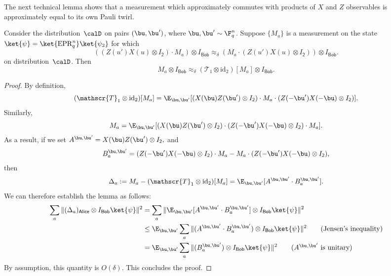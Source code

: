 \documentclass[11pt]{article}
\newcommand{\twirl}{\mathscr{T}}
\newcommand{\reg}[1]{{\mathsf{#1}}}
\begin{document}
The next technical lemma shows that a measurement which approximately commutes with products of $X$ and $Z$ observables
is approximately equal to its own Pauli twirl.

\begin{lemma}\label{lem:commute-to-twirl}
Consider the distribution~$\calD$ on pairs $(\bu, \bu')$, where $\bu, \bu' \sim \F_q^n$.
Suppose $\{M_{a}\}$ is a measurement on the state $\ket{\psi} = \ket{\mathrm{EPR}_q^n} \ket{\psi_2}$ for which
\begin{equation*}
((Z(u') X(u)\otimes I_{\reg{2}}) \cdot M_{a}) \otimes I_{\reg{Bob}}
\approx_{\delta} (M_{a} \cdot (Z(u') X(u)\otimes I_{\reg{2}})) \otimes I_{\reg{Bob}}.
\end{equation*}
on distribution~$\calD$. Then
\begin{equation*}
M_{a} \otimes I_{\reg{Bob}} \approx_{\delta} (\twirl_1 \otimes \mathrm{id}_{\mathrm{2}})[M_{a}] \otimes I_{\reg{Bob}}.
\end{equation*}
\end{lemma}
\begin{proof}
By definition,
\begin{equation*}
(\twirl_1 \otimes \mathrm{id}_{\mathrm{2}})[M_{a}]
= \E_{\bu, \bu'} [(X(\bu) Z(\bu') \otimes I_{\reg{2}}) \cdot M_a \cdot (Z(-\bu') X(-\bu) \otimes I_{\reg{2}})].
\end{equation*}
Similarly,
\begin{equation*}
M_{a}
= \E_{\bu, \bu'} [(X(\bu) Z(\bu') \otimes I_{\reg{2}}) \cdot (Z(-\bu') X(-\bu) \otimes I_{\reg{2}}) \cdot M_a].
\end{equation*}
As a result, if we set
$
A^{\bu, \bu'} = X(\bu) Z(\bu') \otimes I_{\reg{2}},
$
and
\begin{equation*}
B^{\bu, \bu'}_a = (Z(-\bu') X(-\bu) \otimes I_{\reg{2}}) \cdot M_a - M_a \cdot (Z(-\bu') X(-\bu) \otimes I_{\reg{2}}),
\end{equation*}
then
\begin{equation*}
\Delta_a:=
M_a - (\twirl_1 \otimes \mathrm{id}_{\mathrm{2}})[M_a]
= \E_{\bu, \bu'} [A^{\bu, \bu'} \cdot B^{\bu, \bu'}_a].
\end{equation*}
We can therefore establish the lemma as follows:
\begin{align*}
\sum_a \Vert (\Delta_a)_{\reg{Alice}} \otimes I_{\reg{Bob}} \ket{\psi} \Vert^2
& = \sum_a \Vert \E_{\bu, \bu'} [A^{\bu, \bu'} \cdot B^{\bu, \bu'}_a] \otimes I_{\reg{Bob}} \ket{\psi} \Vert^2\\
& \leq \E_{\bu, \bu'} \sum_a \Vert (A^{\bu, \bu'} \cdot B^{\bu, \bu'}_a) \otimes I_{\reg{Bob}} \ket{\psi} \Vert^2\tag{Jensen's inequality}\\
& = \E_{\bu, \bu'} \sum_a \Vert (B^{\bu, \bu'}_a) \otimes I_{\reg{Bob}} \ket{\psi} \Vert^2 \tag{$A^{\bu, \bu'}$ is unitary}
\end{align*}
By assumption, this quantity is $O(\delta)$. This concludes the proof.
\end{proof}
\end{document}

